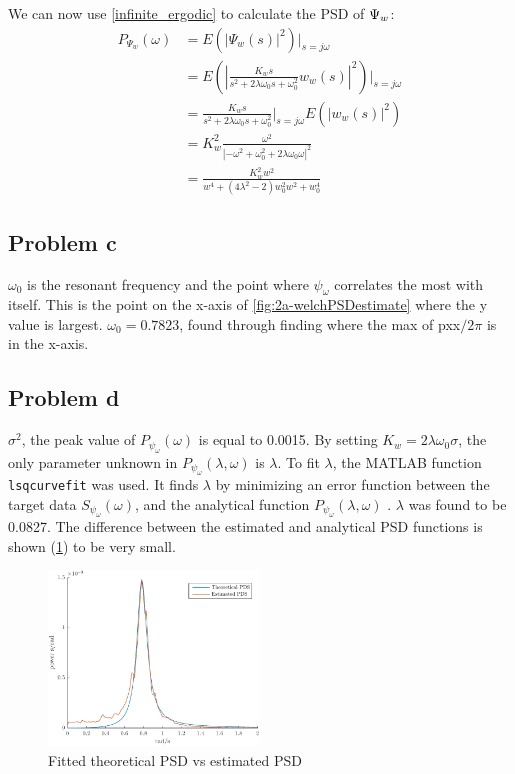 We can now use \cref{infinite_ergodic} to calculate the PSD of $\Psi_w$:
\begin{align*}
    P_{\Psi_w}(\omega) &= E(\left|\Psi_w(s)\right|^2)|_{s=j\omega} \\
    &= E\left(\left|\frac{K_ws}{s^2 + 2\lambda\omega_0s + \omega^2_0}w_w(s)\right|^2\right)|_{s=j\omega} \\
    &= \frac{K_ws}{s^2 + 2\lambda\omega_0s + \omega^2_0}|_{s=j\omega} E(\left|w_w(s)\right|^2) \\
    &= K_w^2\frac{\omega^2}{\left|-\omega^2+\omega^2_0+2\lambda\omega_0\omega\right|^2} \\
    &= \frac{K_w^2w^2}{w^4+(4\lambda^2-2)w_0^2w^2+w_0^4}
\end{align*}

\subsection{Problem c}
$\omega_0$ is the resonant 
frequency and the point where $\psi_\omega$ correlates the most with itself.  This is the point on the x-axis of \cref{fig:2a-welchPSDestimate} where the y value is largest.
$\omega_0 = 0.7823$, found through finding where the max of pxx$/2\pi$ is in the x-axis.  

\subsection{Problem d}
$\sigma^2$, the peak value of $P_{\psi_\omega}(\omega)$ is equal to 0.0015.
By setting $K_w = 2\lambda\omega_0\sigma$, the only parameter unknown in $P_{\psi_\omega}(\lambda, \omega)$ is $\lambda$. To fit $\lambda$, the MATLAB function \texttt{lsqcurvefit} was used. It finds $\lambda$ by minimizing an error
function between the target data $S_{\psi_\omega}(\omega)$, and the analytical function $P_{\psi_\omega}(\lambda, \omega)$ . $\lambda$ was found to be 0.0827. The difference between the estimated and analytical PSD functions is shown (\cref{fig:2d-fitted_theoretical_PSD_vs_estimated_PSD}) to be very small.

\begin{figure}[ht]
    \centering
    \includegraphics[width=0.5\textwidth]{images/2d-fitted_theoretical_PSD_vs_estimated_PSD}
    \caption{Fitted theoretical PSD vs estimated PSD}
    \label{fig:2d-fitted_theoretical_PSD_vs_estimated_PSD}
\end{figure}
